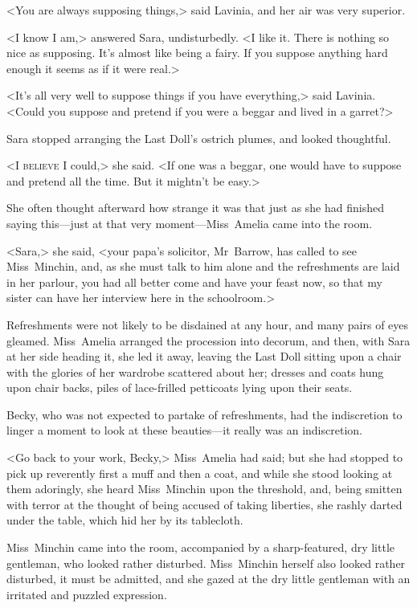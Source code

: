 <You are always supposing things,> said Lavinia, and her air was very superior.

<I know I am,> answered Sara, undisturbedly. <I like it. There is nothing so nice as supposing. It's almost like being a fairy. If you suppose anything hard enough it seems as if it were real.>

<It's all very well to suppose things if you have everything,> said Lavinia. <Could you suppose and pretend if you were a beggar and lived in a garret?>

Sara stopped arranging the Last Doll's ostrich plumes, and looked thoughtful.

<I \textsc{believe} I could,> she said. <If one was a beggar, one would have to suppose and pretend all the time. But it mightn't be easy.>

She often thought afterward how strange it was that just as she had finished saying this—just at that very moment—Miss~Amelia came into the room.

<Sara,> she said, <your papa's solicitor, Mr~Barrow, has called to see Miss~Minchin, and, as she must talk to him alone and the refreshments are laid in her parlour, you had all better come and have your feast now, so that my sister can have her interview here in the schoolroom.>

Refreshments were not likely to be disdained at any hour, and many pairs of eyes gleamed. Miss~Amelia arranged the procession into decorum, and then, with Sara at her side heading it, she led it away, leaving the Last Doll sitting upon a chair with the glories of her wardrobe scattered about her; dresses and coats hung upon chair backs, piles of lace-frilled petticoats lying upon their seats.

Becky, who was not expected to partake of refreshments, had the indiscretion to linger a moment to look at these beauties—it really was an indiscretion.

<Go back to your work, Becky,> Miss~Amelia had said; but she had stopped to pick up reverently first a muff and then a coat, and while she stood looking at them adoringly, she heard Miss~Minchin upon the threshold, and, being smitten with terror at the thought of being accused of taking liberties, she rashly darted under the table, which hid her by its tablecloth.

Miss~Minchin came into the room, accompanied by a sharp-featured, dry little gentleman, who looked rather disturbed. Miss~Minchin herself also looked rather disturbed, it must be admitted, and she gazed at the dry little gentleman with an irritated and puzzled expression.


